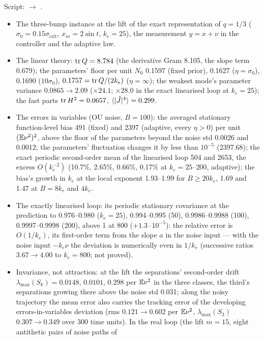 Script:  $\to$ .
\begin{itemize}
  \item The three-bump instance at the lift of the exact representation of $q=1/3$
    ($\sigma_0=0.15\sigma_{\mathrm{crit}}$, $x_m=2\sin t$, $k_e=25$), the measurement $y=x+\nu$ in the controller and
    the adaptive law.
  \item The linear theory: $\operatorname{tr} Q=8.784$ (the derivative Gram 8.105, the slope term 0.679); the parameters' floor per
    unit $N_0$ 0.1597 (fixed prior), 0.1627 ($\eta=\sigma_0$), 0.1690 ($10\sigma_0$), $0.1757=\operatorname{tr} Q/(2k_e)$
    ($\eta=\infty$); the weakest mode's parameter variance $0.0865\to2.09$ ($\times24.1$; $\times28.0$ in the exact
    linearised loop at $k_e=25$); the fast parts $\operatorname{tr} H^2=0.0657$, $\langle\lvert \hat J\rvert^4\rangle=0.299$.
  \item The errors in variables (OU noise, $B=100$): the averaged stationary function-level bias 491 (fixed) and 2397
    (adaptive, every $\eta>0$) per unit $(\mathbb{E}\nu^2)^2$, above the floor of the parameters beyond the noise std 0.0026
    and 0.0012; the parameters' fluctuation changes it by less than $10^{-5}$ (2397.68); the exact periodic
    second-order mean of the linearised loop 504 and 2653, the excess $O(k_e^{-2})$ (10.7\%, 2.65\%, 0.66\%, 0.17\%
    at $k_e=25$--$200$, adaptive); the bias's growth in $k_e$ at the local exponent 1.93--1.99 for $B\ge20k_e$, 1.69
    and 1.47 at $B=8k_e$ and $4k_e$.
  \item The exactly linearised loop: its periodic stationary covariance at the prediction to 0.976--0.980
    ($k_e=25$), 0.994--0.995 (50), 0.9986--0.9988 (100), 0.9997--0.9998 (200), above 1 at 800 ($+1.3\cdot10^{-5}$):
    the relative error is $O(1/k_e)$, its first-order term from the slope $a$ in the noise input --- with the noise
    input $-k_e\nu$ the deviation is numerically even in $1/k_e$ (successive ratios $3.67\to4.00$ to $k_e=800$; not
    proved).
  \item Invariance, not attraction: at the lift the separations' second-order drift
    $\lambda_{\max}(S_k)=0.0148$, $0.0101$, $0.298$ per $\mathbb{E}\nu^2$ in the three classes, the third's separations
    growing there above the noise std 0.031; along the noisy trajectory the mean error also carries the tracking error
    of the developing errors-in-variables deviation (rms $0.121\to0.602$ per $\mathbb{E}\nu^2$, $\lambda_{\max}(S_3)$
    $0.307\to0.349$ over 300 time units). In the real loop (the lift $m=15$, eight antithetic pairs of noise paths of

\end{itemize}
